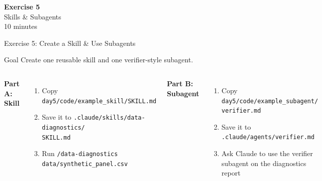\documentclass[aspectratio=169,10pt]{beamer}
\begin{document}
\begin{frame}{}
\vfill\begin{center}{\Huge \textcolor{uzhblue}{\textbf{Exercise 5}}}\\[12pt]
{\LARGE Skills \& Subagents}\\[6pt]{\small 10 minutes}\end{center}\vfill
\end{frame}

\begin{frame}[fragile]{Exercise 5: Create a Skill \& Use Subagents}
\begin{exampleblock}{Goal}
Create one reusable skill and one verifier-style subagent.
\end{exampleblock}
\small
\begin{columns}[T]
\textbf{Part A: Skill}
\begin{enumerate}\itemsep1pt
    \item Copy \texttt{day5/code/example\_skill/SKILL.md}
    \item Save it to \texttt{.claude/skills/data-diagnostics/}\\
    \texttt{SKILL.md}
    \item Run \texttt{/data-diagnostics data/synthetic\_panel.csv}
\end{enumerate}

\textbf{Part B: Subagent}
\begin{enumerate}\itemsep1pt
    \item Copy \texttt{day5/code/example\_subagent/}\\
    \texttt{verifier.md}
    \item Save it to \texttt{.claude/agents/verifier.md}
    \item Ask Claude to use the verifier subagent on the diagnostics report
\end{enumerate}
\end{columns}
\end{frame}
\end{document}
